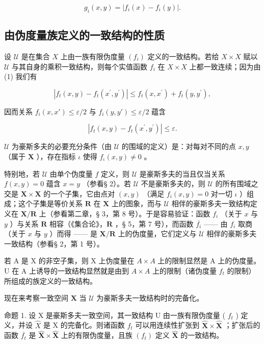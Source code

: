 \[
g _ {i} (x, y) = | f _ {i} (x) - f _ {i} (y) |.
\]

\subsection{由伪度量族定义的一致结构的性质}

设 \(\mathcal{U}\) 是在集合 \(X\) 上由一族有限伪度量 \((f_{i})\) 定义的一致结构。若给 \(X \times X\) 赋以 \(\mathcal{U}\) 与其自身的乘积一致结构，则每个实值函数 \(f_{i}\) 在 \(X \times X\) 上都一致连续；因为由 (1) 我们有

\[
\left| f _ {t} (x, y) - f _ {t} \left(x ^ {\prime}, y ^ {\prime}\right) \right| \leqslant f _ {t} (x, x ^ {\prime}) + f _ {t} (y, y ^ {\prime}),
\]

因而关系 \(f_{i}(x, x') \leqslant \varepsilon / 2\) 与 \(f_{i}(y, y') \leqslant \varepsilon / 2\) 蕴含

\[
\left| f _ {t} (x, y) - f _ {t} \left(x ^ {\prime}, y ^ {\prime}\right) \right| \leqslant \varepsilon .
\]

\(\mathcal{U}\) 为豪斯多夫的必要充分条件（由 \(\mathcal{U}\) 的围域的定义）是：对每对不同的点 \(x, y\) （属于 \(\mathbf{X}\) ），存在指标 \(\iota\) 使得 \(f_{\iota}(x, y) \neq 0\) 。

特别地，若 \(\mathcal{U}\) 由单个伪度量 \(f\) 定义，则 \(\mathcal{U}\) 是豪斯多夫的当且仅当关系 \(f(x,y)=0\) 蕴含 \(x=y\) （参看§ 2）。若 \(\mathcal{U}\) 不是豪斯多夫的，则 \(\mathcal{U}\) 的所有围域之交是 \(\mathbf{X} \times \mathbf{X}\) 的一个子集，它由点对 \((x,y)\) （满足 \(f_{i}(x,y)=0\) 对一切 \(\iota\) ）组成；这个子集是等价关系 \(\mathbf{R}\) 在 \(\mathbf{X}\) 上的图象，而与 \(\mathcal{U}\) 相伴的豪斯多夫一致结构定义在 \(\mathbf{X}/\mathbf{R}\) 上（参看第二章，§ 3，第 8 号）。于是容易验证：函数 \(f_{i}\) （关于 \(x\) 与 \(y\) ）与关系 \(\mathbf{R}\) 相容（《集合论》，\(\mathbf{R}\) ，§ 5，第 7 号），而函数 \(\overline{f_{i}}\) —— 由 \(f_{i}\) 取商（关于 \(x\) 与 \(y\) ）而得 —— 是 \(\mathbf{X}/\mathbf{R}\) 上的伪度量，它们定义与 \(\mathcal{U}\) 相伴的豪斯多夫一致结构（参看§ 2，第 1 号）。

若 A 是 X 的非空子集，则 X 上伪度量在 \(A \times A\) 上的限制显然是 A 上的伪度量。U 在 A 上诱导的一致结构显然就是由到 \(A \times A\) 上的限制（诸伪度量 \(f_{t}\) 的限制）所组成的族定义的一致结构。

现在来考察一致空间 \(\mathbf{X}\) 当 \(\mathcal{U}\) 为豪斯多夫一致结构时的完备化。

命题 1. 设 X 是豪斯多夫一致空间，其一致结构 U 由一族有限伪度量 ( \(f_{t}\) ) 定义，并设 \(\hat{X}\) 是 X 的完备化。则诸函数 \(f_{t}\) 可以用连续性扩张到 \(\hat{\mathbf{X}} \times \hat{\mathbf{X}}\) ；扩张后的函数 \(\overline{f_t}\) 是 \(\hat{\mathbf{X}} \times \hat{\mathbf{X}}\) 上的有限伪度量，且族 \((f_{t})\) 定义 \(\hat{\mathbf{X}}\) 的一致结构。

